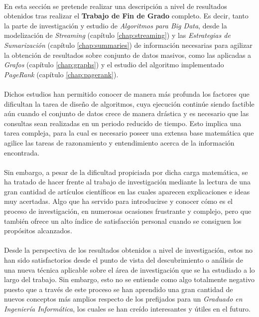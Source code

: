 \documentclass{subfiles}
\begin{document}
      \paragraph{}
      En esta sección se pretende realizar una descripción a nivel de resultados obtenidos tras realizar el \textbf{Trabajo de Fin de Grado} completo. Es decir, tanto la parte de investigación y estudio de \emph{Algoritmos para Big Data}, desde la modelización de \emph{Streaming} (capítulo \ref{chap:streaming}) y las \emph{Estrategias de Sumarización} (capítulo \ref{chap:summaries}) de información necesarias para agilizar la obtención de resultados sobre conjunto de datos masivos, como las aplicadas a \emph{Grafos} (capítulo \ref{chap:graphs}) y el estudio del algoritmo implementado \emph{PageRank} (capítulo \ref{chap:pagerank}).

      \paragraph{}
      Dichos estudios han permitido conocer de manera más profunda los factores que dificultan la tarea de diseño de algoritmos, cuya ejecución continúe siendo factible aún cuando el conjunto de datos crece de manera drástica y es necesario que las consultas sean realizadas en un periodo reducido de tiempo. Esto implica una tarea compleja, para la cual es necesario poseer una extensa base matemática que agilice las tareas de razonamiento y entendimiento acerca de la información encontrada.

      \paragraph{}
      Sin embargo, a pesar de la dificultad propiciada por dicha carga matemática, se ha tratado de hacer frente al trabajo de investigación mediante la lectura de una gran cantidad de artículos científicos en las cuales aparecen explicaciones e ideas muy acertadas. Algo que ha servido para introducirse y conocer cómo es el proceso de investigación, en numerosas ocasiones frustrante y complejo, pero que también ofrece un alto índice de satisfacción personal cuando se consiguen los propósitos alcanzados.

      \paragraph{}
      Desde la perspectiva de los resultados obtenidos a nivel de investigación, estos no han sido satisfactorios desde el punto de vista del descubrimiento o análisis de una nueva técnica aplicable sobre el área de investigación que se ha estudiado a lo largo del trabajo. Sin embargo, esto no se entiende como algo totalmente negativo puesto que a través de este proceso se han aprendido una gran cantidad de nuevos conceptos más amplios respecto de los prefijados para un \emph{Graduado en Ingeniería Informática}, los cuales se han creído interesantes y útiles en el futuro.
\end{document}
